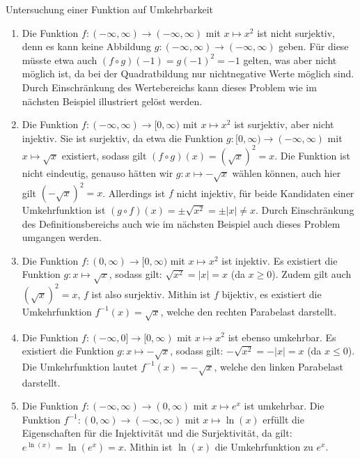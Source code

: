 \begin{example}{Untersuchung einer Funktion auf Umkehrbarkeit}{}
    \begin{enumerate}
        \item Die Funktion $f: (-\infty,\infty) \to (-\infty,\infty)$ mit $x \mapsto x^2$ ist nicht surjektiv, denn es kann keine Abbildung $g: (-\infty,\infty) \to (-\infty,\infty)$ geben. Für diese müsste etwa auch $(f \circ g)(-1) = g(-1)^2 = -1$ gelten, was aber nicht möglich ist, da bei der Quadratbildung nur nichtnegative Werte möglich sind. Durch Einschränkung des Wertebereichs kann dieses Problem wie im nächsten Beispiel illustriert gelöst werden.
        \item Die Funktion $f: (-\infty,\infty) \to [0,\infty)$ mit $x \mapsto x^2$ ist surjektiv, aber nicht injektiv. Sie ist surjektiv, da etwa die Funktion $g: [0,\infty) \to (-\infty,\infty)$ mit $x \mapsto \sqrt{x}$ existiert,  sodass gilt $(f \circ g)(x) = (\sqrt{x})^2 = x$. Die Funktion ist nicht eindeutig, genauso hätten wir $g: x \mapsto -\sqrt{x}$ wählen können, auch hier gilt $(-\sqrt{x})^2 = x$. Allerdings ist $f$ nicht injektiv, für beide Kandidaten einer Umkehrfunktion ist $(g \circ f)(x) = \pm\sqrt{x^2} = \pm|x| \ne x$. Durch Einschränkung des Definitionsbereichs auch wie im nächsten Beispiel auch dieses Problem umgangen werden.
        \item Die Funktion $f: (0,\infty) \to [0,\infty)$ mit $x \mapsto x^2$ ist injektiv. Es existiert die Funktion $g: x \mapsto \sqrt{x}$, sodass gilt: $\sqrt{x^2}=|x|=x$ (da $x\ge 0$). Zudem gilt auch $\left(\sqrt{x}\right)^2=x$, $f$ ist also surjektiv. Mithin ist $f$ bijektiv, es existiert die Umkehrfunktion $f^{-1}(x) = \sqrt{x}$, welche den rechten Parabelast darstellt.
        \item Die Funktion $f: (-\infty,0] \to [0,\infty)$ mit $x \mapsto x^2$ ist ebenso umkehrbar. Es existiert die Funktion $g: x \mapsto -\sqrt{x}$, sodass gilt: $-\sqrt{x^2}=-|x|=x$ (da $x\le 0$). Die Umkehrfunktion lautet $f^{-1}(x) = -\sqrt{x}$, welche den linken Parabelast darstellt.
        \item Die Funktion $f: (-\infty,\infty) \to (0, \infty)$ mit $x \mapsto e^x$ ist umkehrbar. Die Funktion $f^{-1}: (0, \infty) \to (-\infty,\infty)$ mit $x \mapsto \ln(x)$ erfüllt die Eigenschaften für die Injektivität und die Surjektivität, da gilt: $e^{\ln(x)} = \ln(e^x) = x$.  Mithin ist $\ln(x)$ die Umkehrfunktion zu $e^x$.
    \end{enumerate}
\end{example}

